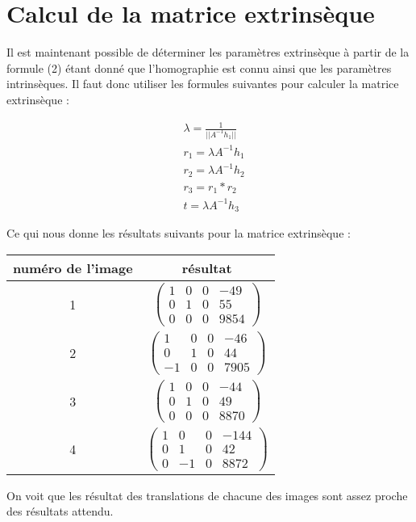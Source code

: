 \documentclass[a4paper,10pt]{article}
\begin{document}
\section{Calcul de la matrice extrinsèque}
Il est maintenant possible de déterminer les paramètres extrinsèque à partir de la formule (2)
étant donné que l'homographie est connu ainsi que les paramètres intrinsèques. Il faut donc utiliser
les formules suivantes pour calculer la matrice extrinsèque : 

\begin{align}
 &\lambda = \frac{1}{||A^{-1}h_1||}\\
 &r_1=\lambda A^{-1}h_1\\
 &r_2=\lambda A^{-1}h_2\\
 &r_3=r_1*r_2\\
 &t=\lambda A^{-1}h_3
\end{align}

Ce qui nous donne les résultats suivants pour la matrice extrinsèque :\\ 

\begin{center}
\begin{tabular}{|c|c|}
 \hline
 numéro de l'image & résultat\\
 \hline
 1 & $\begin{pmatrix} 1 & 0 & 0 & -49\\0 & 1 & 0 & 55\\ 0 & 0 & 0 & 9854\end{pmatrix}$\\
 \hline
 2 & $\begin{pmatrix} 1 & 0 & 0 & -46\\0 & 1 & 0 & 44\\ -1 & 0 & 0 & 7905\end{pmatrix}$\\
 \hline
 3 & $\begin{pmatrix} 1 & 0 & 0 & -44\\0 & 1 & 0 & 49\\ 0 & 0 & 0 & 8870\end{pmatrix}$\\
 \hline
 4 & $\begin{pmatrix} 1 & 0 & 0 & -144\\0 & 1 & 0 & 42\\ 0 & -1 & 0 & 8872\end{pmatrix}$\\
 \hline
\end{tabular}
\end{center}
On voit que les résultat des translations de chacune des images sont assez proche des résultats
attendu. 
\end{document}
